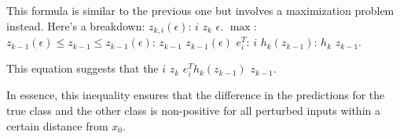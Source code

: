 This formula is similar to the previous one but involves a maximization problem instead. Here's a breakdown:
$z_{k,i}(\epsilon)$:  $i$  $z_k$  $\epsilon$.
$\max$: 
$z_{k-1}(\epsilon) \leq z_{k-1} \leq z_{k-1}(\epsilon)$:  $z_{k-1}$  $z_{k-1}(\epsilon)$ 
$e^T_i$:  $i$ 
$h_k(z_{k-1})$:  $h_k$  $z_{k-1}$.

This equation suggests that the $i$  $z_k$  $e^T_i h_k(z_{k-1})$  $z_{k-1}$.

In essence, this inequality ensures that the difference in the predictions for the true class and the other class is non-positive for all perturbed inputs within a certain distance from $x_0$.